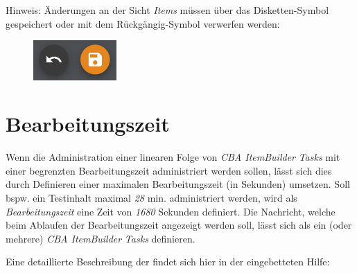 \documentclass[
  letterpaper,
  DIV=11]{scrreprt}
\begin{document}
\begin{tcolorbox}
Hinweis: Änderungen an der Sicht \emph{Items} müssen über das
Disketten-Symbol gespeichert oder mit dem Rückgängig-Symbol verwerfen
werden:

\begin{figure}[H]

\includegraphics[width=1.25in,height=\textheight]{img/screenshot-icons-undo-and-save-01.png} \hfill{}

\end{figure}

\end{tcolorbox}

\hypertarget{bearbeitungszeit-1}{%
\section{Bearbeitungszeit}\label{bearbeitungszeit-1}}

Wenn die Administration einer linearen Folge von \emph{CBA ItemBuilder}
\emph{Tasks} mit einer begrenzten Bearbeitungszeit administriert werden
sollen, lässt sich dies durch Definieren einer maximalen
Bearbeitungszeit (in Sekunden) umsetzen. Soll bspw. ein Testinhalt
maximal \emph{28} min. administriert werden, wird als
\emph{Bearbeitungszeit} eine Zeit von \emph{1680} Sekunden definiert.
Die Nachricht, welche beim Ablaufen der Bearbeitungszeit angezeigt
werden soll, lässt sich als ein (oder mehrere) \emph{CBA ItemBuilder}
\emph{Tasks} definieren.

Eine detaillierte Beschreibung der findet sich hier in der eingebetteten
Hilfe:
\end{document}

